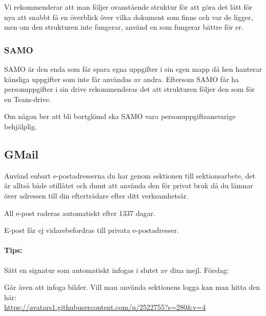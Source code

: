 Vi rekommenderar att man följer ovanstående struktur för att göra det lätt för nya att snabbt få en överblick över vilka dokument som finns och var de ligger, men om den strukturen inte fungerar, använd en som fungerar bättre för er.

\subsubsection{SAMO}

SAMO är den enda som får spara egna uppgifter i sin egen mapp då hen hanterar känsliga uppgifter som inte får användas av andra. Eftersom SAMO får ha personuppgifter i sin drive rekommenderas det att strukturen följer den som för en Team-drive.

Om någon ber att bli bortglömd ska SAMO vara personuppgiftsansvarige behjälplig.

\subsection{GMail}

Använd enbart e-postadresserna du har genom sektionen till sektionsarbete, det är alltså både otillåtet och dumt att använda den för privat bruk då du lämnar över adressen till din efterträdare efter ditt verksamhetsår.

All e-post raderas automatiskt efter 1337 dagar.

E-post får ej vidarebefordras till privata e-postadresser.

\paragraph{Tips:}  Sätt en signatur som automatiskt infogas i slutet av dina mejl. Förslag:


\noindent{}

Går även att infoga bilder. Vill man använda sektionens logga kan man hitta den här:\\
\url{https://avatars1.githubusercontent.com/u/2522755?s=280\&v=4}

